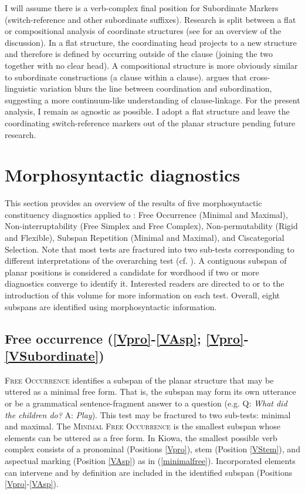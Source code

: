 \documentclass[output=paper]{langscibook}
\begin{document}
I will assume there is a verb-complex final position for Subordinate Markers (switch-reference and other subordinate suffixes). Research is split between a flat or compositional analysis of coordinate structures (see \citealt{wagner:2010} for an overview of the discussion). In a flat structure, the coordinating head projects to a new structure and therefore is defined by occurring outside of the clause (joining the two together with no clear head). A compositional structure is more obviously similar to subordinate constructions (a clause within a clause). \citet{bickel:2010} argues that cross-linguistic variation blurs the line between coordination and subordination, suggesting a more continuum-like understanding of clause-linkage. For the present analysis, I remain as agnostic as possible. I adopt a flat structure and leave the coordinating switch-reference markers out of the planar structure pending future research. 

\section{Morphosyntactic diagnostics} 
\label{sec:morphosyntactic}

This section provides an overview of the results of five morphosyntactic constituency diagnostics applied to : Free Occurrence (Minimal and Maximal), Non-interruptability (Free Simplex and Free Complex), Non-permutability (Rigid and Flexible), Subspan Repetition (Minimal and Maximal), and Ciscategorial Selection. Note that most tests are fractured into two sub-tests corresponding to different interpretations of the overarching test (cf. \citealt{Tallman:ur}). A contiguous subspan of planar positions is considered a candidate for wordhood if two or more diagnostics converge to identify it. Interested readers are directed to \citet{Tallman:ur} or to the introduction of this volume for more information on each test. Overall, eight subspans are identified using morphosyntactic information.

\subsection{Free occurrence (\ref{Vpro}-\ref{VAsp}; \ref{Vpro}-\ref{VSubordinate})} \label{sec:free}

{\textsc{Free Occurrence}} identifies a subspan of the planar structure that may be uttered as a minimal free form. That is, the subspan may form its own utterance or be a grammatical sentence-fragment answer to a question (e.g. Q: \textit{What did the children do?} A: \textit{Play}). This test may be fractured to two sub-tests: minimal and maximal. The {\textsc{Minimal Free Occurrence}} is the smallest subspan whose elements can be uttered as a free form. In Kiowa, the smallest possible verb complex consists of a pronominal (Positions \ref{Vpro}), stem (Position \ref{VStem}), and aspectual marking (Position \ref{VAsp}) as in (\ref{minimalfree}). Incorporated elements can intervene and by definition are included in the identified subspan (Positions \ref{Vpro}-\ref{VAsp}).
\end{document}
